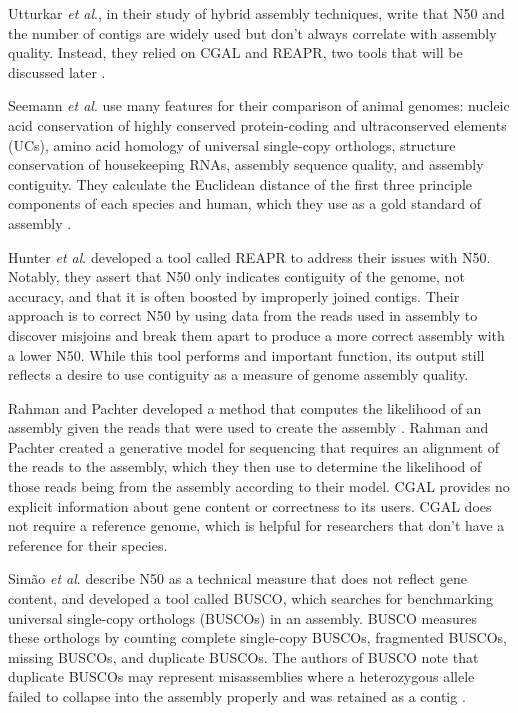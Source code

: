 \documentclass[twocolumn, dvipsnames]{bmcart}%
\begin{document}
Utturkar \textit{et al}., in their study of hybrid assembly techniques, write that N50 and the number of contigs are widely used but don't always correlate with assembly quality. Instead, they relied on CGAL and REAPR, two tools that will be discussed later \cite{Utturkar2014}.

Seemann \textit{et al}. use many features for their comparison of animal genomes: nucleic acid conservation of highly conserved protein-coding and ultraconserved elements (UCs), amino acid homology of universal single-copy orthologs, structure conservation of housekeeping RNAs, assembly sequence quality, and assembly contiguity. They calculate the Euclidean distance of the first three principle components of each species and human, which they use as a gold standard of assembly \cite{Seemann2015}.

Hunter \textit{et al}. developed a tool called REAPR \cite{Hunt2013} to address their issues with N50. Notably, they assert that N50 only indicates contiguity of the genome, not accuracy, and that it is often boosted by improperly joined contigs. Their approach is to correct N50 by using data from the reads used in assembly to discover misjoins and break them apart to produce a more correct assembly with a lower N50. While this tool performs and important function, its output still reflects a desire to use contiguity as a measure of genome assembly quality.

Rahman and Pachter developed a method that computes the likelihood of an assembly given the reads that were used to create the assembly \cite{Rahman2013}. Rahman and Pachter created a generative model for sequencing that requires an alignment of the reads to the assembly, which they then use to determine the likelihood of those reads being from the assembly according to their model. CGAL provides no explicit information about gene content or correctness to its users. CGAL does not require a reference genome, which is helpful for researchers that don't have a reference for their species.

Sim{\~a}o \textit{et al}. describe N50 as a technical measure that does not reflect gene content, and developed a tool called BUSCO, which searches for benchmarking universal single-copy orthologs (BUSCOs) in an assembly. BUSCO measures these orthologs by counting complete single-copy BUSCOs, fragmented BUSCOs, missing BUSCOs, and duplicate BUSCOs. The authors of BUSCO note that duplicate BUSCOs may represent misassemblies where a heterozygous allele failed to collapse into the assembly properly and was retained as a contig \cite{Simao2015}.
\end{document}
